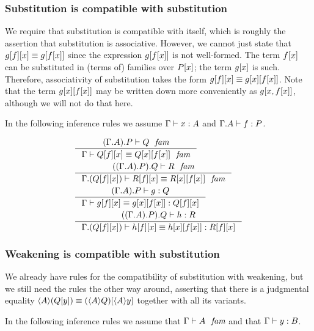 \subsubsection{Substitution is compatible with substitution}\label{comp-ss}

We require that substitution is compatible with itself, which is roughly the
assertion that substitution is associative. However, we cannot just state that
$\subst{x}{{f}{g}}\jdeq\subst{{x}{f}}{g}$ since the expression $\subst{{x}{f}}{g}$
is not well-formed. The term $\subst{x}{f}$ can be substituted in (terms of) families over
$\subst{x}{P}$; the term $\subst{x}{g}$ is such. Therefore, associativity of
substitution takes the form $\subst{x}{{f}{g}}\jdeq\subst{{x}{f}}{{x}{g}}$.
Note that the term $\subst{{x}{f}}{{x}{g}}$ may be written down more conveniently
as $\subst{x,\subst{x}{f}}{g}$, although we will not do that here.

In the following inference rules we assume
$\jterm{\Gamma}{A}{x}$ and $\jterm{\ctxext{\Gamma}{A}}{P}{f}$.

\begin{align}
&\inference{\jfam{\ctxext{{\Gamma}{A}}{P}}{Q}}
{\jfameq{\Gamma}{\subst{x}{{f}{Q}}}{\subst{{x}{f}}{{x}{Q}}}}\\
&\inference{\jfam{\ctxext{{{\Gamma}{A}}{P}}{Q}}{R}}
{\jfameq{\ctxext{\Gamma}{\subst{x}{{f}{Q}}}}{\subst{x}{{f}{R}}}{\subst{{x}{f}}{{x}{R}}}}\\
&\inference{\jterm{\ctxext{{\Gamma}{A}}{P}}{Q}{g}}
{\jtermeq{\Gamma}{\subst{x}{{f}{Q}}}{\subst{x}{{f}{g}}}{\subst{{x}{f}}{{x}{g}}}}\\
&\inference{\jterm{\ctxext{{{\Gamma}{A}}{P}}{Q}}{R}{h}}
{\jtermeq{\ctxext{\Gamma}{\subst{x}{{f}{Q}}}}{\subst{x}{{f}{R}}}{\subst{x}{{f}{h}}}{\subst{{x}{f}}{{x}{h}}}}
\end{align}

\subsubsection{Weakening is compatible with substitution}\label{comp-ws}
We already have rules for the compatibility of substitution with weakening, but
we still need the rules the other way around, asserting that there is a 
judgmental equality $\ctxwk{A}{\subst{y}{Q}}\jdeq\subst{\ctxwk{A}{y}}{\ctxwk{A}{Q}}$
together with all its variants.

In the following inference rules we assume that $\jfam{\Gamma}{A}$ and that
$\jterm{\Gamma}{B}{y}$.

